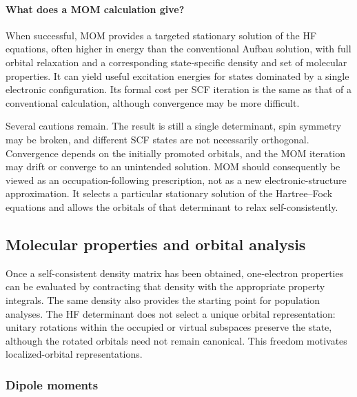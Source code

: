 \documentclass[11pt,a4paper,titlepage]{article}
\numberwithin{equation}{section}
\begin{document}
\paragraph{What does a MOM calculation give?}

When successful, MOM provides a targeted stationary solution of the HF
equations, often higher in energy than the conventional Aufbau solution,
with full orbital relaxation and a corresponding
state-specific density and set of molecular properties. It can yield useful
excitation energies for states dominated by a single electronic
configuration. Its formal cost per SCF iteration is the same as that of a
conventional calculation, although convergence may be more difficult.

Several cautions remain. The result is still a single determinant, spin
symmetry may be broken, and different SCF states are not necessarily
orthogonal. Convergence depends on the initially promoted orbitals, and the
MOM iteration may drift or converge to an unintended solution.
MOM should consequently be viewed as an occupation-following prescription,
not as a new electronic-structure approximation. It selects a particular
stationary solution of the Hartree--Fock equations and allows the orbitals of
that determinant to relax self-consistently.

\subsection{Molecular properties and orbital analysis}

Once a self-consistent density matrix has been obtained, one-electron
properties can be evaluated by contracting that density with the appropriate
property integrals. The same density also provides the starting point for
population analyses. The HF determinant does not select a unique orbital
representation: unitary rotations within the occupied or virtual subspaces
preserve the state, although the rotated orbitals need not remain canonical. This
freedom motivates localized-orbital representations.

\subsubsection{Dipole moments}
\end{document}
